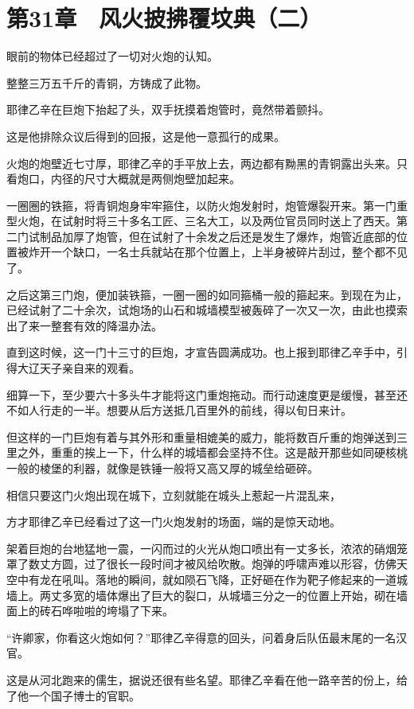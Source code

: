 \section{第31章　风火披拂覆坟典（二）}

眼前的物体已经超过了一切对火炮的认知。

整整三万五千斤的青铜，方铸成了此物。

耶律乙辛在巨炮下抬起了头，双手抚摸着炮管时，竟然带着颤抖。

这是他排除众议后得到的回报，这是他一意孤行的成果。

火炮的炮壁近七寸厚，耶律乙辛的手平放上去，两边都有黝黑的青铜露出头来。只看炮口，内径的尺寸大概就是两侧炮壁加起来。

一圈圈的铁箍，将青铜炮身牢牢箍住，以防火炮发射时，炮管爆裂开来。第一门重型火炮，在试射时将三十多名工匠、三名大工，以及两位官员同时送上了西天。第二门试制品加厚了炮管，但在试射了十余发之后还是发生了爆炸，炮管近底部的位置被炸开一个缺口，一名士兵就站在那个位置上，上半身被碎片刮过，整个都不见了。

之后这第三门炮，便加装铁箍，一圈一圈的如同箍桶一般的箍起来。到现在为止，已经试射了二十余次，试炮场的山石和城墙模型被轰碎了一次又一次，由此也摸索出了来一整套有效的降温办法。

直到这时候，这一门十三寸的巨炮，才宣告圆满成功。也上报到耶律乙辛手中，引得大辽天子亲自来的观看。

细算一下，至少要六十多头牛才能将这门重炮拖动。而行动速度更是缓慢，甚至还不如人行走的一半。想要从后方送抵几百里外的前线，得以旬日来计。

但这样的一门巨炮有着与其外形和重量相媲美的威力，能将数百斤重的炮弹送到三里之外，重重的挨上一下，什么样的城墙都会坚持不住。这是敲开那些如同硬核桃一般的棱堡的利器，就像是铁锤一般将又高又厚的城垒给砸碎。

相信只要这门火炮出现在城下，立刻就能在城头上惹起一片混乱来，

方才耶律乙辛已经看过了这一门火炮发射的场面，端的是惊天动地。

架着巨炮的台地猛地一震，一闪而过的火光从炮口喷出有一丈多长，浓浓的硝烟笼罩了数丈方圆，过了很长一段时间才被风给吹散。炮弹的呼啸声难以形容，仿佛天空中有龙在吼叫。落地的瞬间，就如陨石飞降，正好砸在作为靶子修起来的一道城墙上。两丈多宽的墙体爆出了巨大的裂口，从城墙三分之一的位置上开始，砌在墙面上的砖石哗啦啦的垮塌了下来。

“许卿家，你看这火炮如何？”耶律乙辛得意的回头，问着身后队伍最末尾的一名汉官。

这是从河北跑来的儒生，据说还很有些名望。耶律乙辛看在他一路辛苦的份上，给了他一个国子博士的官职。

